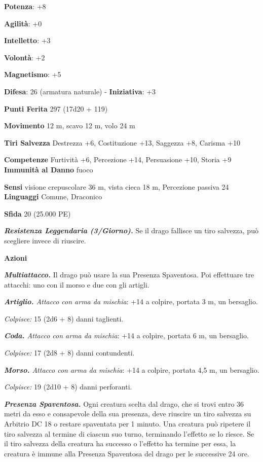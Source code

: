 \begin{multicols}{2}
\textbf{Potenza}: +8

\textbf{Agilità}: +0

\textbf{Intelletto}: +3

\textbf{Volontà}: +2

\textbf{Magnetismo}: +5

\textbf{Difesa}: 26 (armatura naturale) - \textbf{Iniziativa}: +3

\textbf{Punti Ferita} 297 (17d20 + 119)

\textbf{Movimento} 12 m, scavo 12 m, volo 24 m

\textbf{Tiri Salvezza} Destrezza +6, Costituzione +13, Saggezza +8,
Carisma +10

\textbf{Competenze} Furtività +6, Percezione +14, Persuasione +10, Storia
+9 \textbf{Immunità al Danno} fuoco

\textbf{Sensi} visione crepuscolare 36 m, vista cieca 18 m, Percezione passiva
24 \textbf{Linguaggi} Comune, Draconico

\textbf{Sfida} 20 (25.000 PE)\smallskip

\emph{\textbf{Resistenza Leggendaria (3/Giorno).}} Se il drago fallisce
un tiro salvezza, può scegliere invece di riuscire.

\smallskip\textbf{Azioni}

\emph{\textbf{Multiattacco.}} Il drago può usare la sua Presenza
Spaventosa. Poi effettuare tre attacchi: uno con il morso e due con gli
artigli.

\emph{\textbf{Artiglio.} Attacco con arma da mischia}: +14 a colpire,
portata 3 m, un bersaglio.

\emph{Colpisce:} 15 (2d6 + 8) danni taglienti.

\emph{\textbf{Coda.} Attacco con arma da mischia}: +14 a colpire,
portata 6 m, un bersaglio.

\emph{Colpisce:} 17 (2d8 + 8) danni contundenti.

\emph{\textbf{Morso.} Attacco con arma da mischia}: +14 a colpire,
portata 4,5 m, un bersaglio.

\emph{Colpisce:} 19 (2d10 + 8) danni perforanti.

\emph{\textbf{Presenza Spaventosa.}} Ogni creatura scelta dal drago, che
si trovi entro 36 metri da esso e consapevole della sua presenza, deve
riuscire un tiro salvezza su Arbitrio DC 18 o restare spaventata per 1
minuto. Una creatura può ripetere il tiro salvezza al termine di ciascun
suo turno, terminando l'effetto se lo riesce. Se il tiro salvezza della
creatura ha successo o l'effetto ha termine per essa, la creatura è
immune alla Presenza Spaventosa del drago per le successive 24 ore.


\end{multicols}
